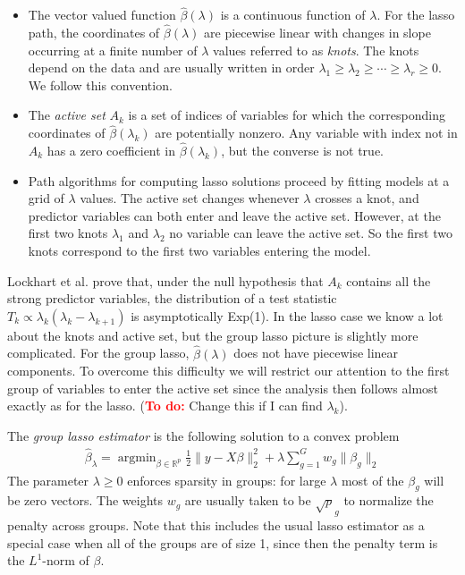 \documentclass{imsart}
\newcommand{\argmin}{\mathop{\mathrm{argmin}}}
\newcommand{\todo}{\textcolor{red}{\textbf{To do: }}}
\newcommand{\real}{\mathbb{R}}
\begin{document}
\begin{itemize}

  \item The vector valued function $\hat \beta(\lambda)$ is a
    continuous function of $\lambda$. For the lasso path, the
    coordinates of $\hat \beta(\lambda)$ are piecewise linear with
    changes in slope occurring at a finite number of $\lambda$ values
    referred to as \emph{knots}. The knots depend on the data and are
    usually written in order $\lambda_1 \geq \lambda_2 \geq \cdots
    \geq \lambda_r \geq 0$. We follow this convention. 

  \item The \emph{active set} $A_k$ is a set of indices of variables
    for which the corresponding coordinates of $\hat \beta(\lambda_k)$
    are potentially nonzero. Any variable with index not in $A_k$ has
    a zero coefficient in $\hat \beta(\lambda_k)$, but the converse is
    not true. 
  
  \item Path algorithms for computing lasso solutions proceed by
    fitting models at a grid of $\lambda$ values. The active set
    changes whenever $\lambda$ crosses a knot, and predictor variables
    can both enter and leave the active set. However, at the first two
    knots $\lambda_1$ and $\lambda_2$ no variable can leave the active
    set. So the first two knots correspond to the first two variables
    entering the model. 

\end{itemize}

Lockhart et al. prove that, under the null hypothesis that $A_k$
contains all the strong predictor variables, the distribution of a
test statistic $T_k \propto \lambda_k(\lambda_k - \lambda_{k+1})$ is
asymptotically Exp(1). In the lasso case we know a lot about the knots
and active set, but the group lasso picture is slightly more
complicated. For the group lasso, $\hat \beta(\lambda)$ does not have
piecewise linear components. To overcome this difficulty we will
restrict our attention to the first group of variables to enter the
active set since the analysis then follows almost exactly as for the
lasso. (\todo Change this if I can find $\lambda_k$). 

The \emph{group lasso estimator} is the following solution to a convex
problem
\begin{equation}
\begin{aligned}
\label{eq:gsoln}
\displaystyle \hat \beta_\lambda = \argmin_{\beta \in \real^p} \frac{1}{2} \| y - X \beta \|_2^2 +
   \lambda \sum_{g=1}^G w_g \| \beta_g \|_2
\end{aligned}
\end{equation}
The parameter $\lambda \geq 0$ enforces sparsity in groups: for large
$\lambda$ most of the $\beta_g$ will be zero vectors. The weights
$w_g$ are usually taken to be $\sqrt p_g$ to normalize the penalty
across groups.  Note that this includes the usual lasso estimator as a
special case when all of the groups are of size 1, since then the
penalty term is the $L^1$-norm of $\beta$. 
\end{document}
